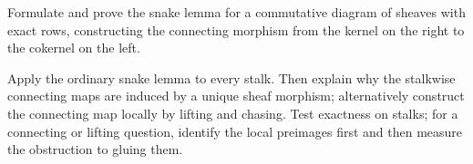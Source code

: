 \begin{problem}\label{chal:vi16-02}
Formulate and prove the snake lemma for a commutative diagram of sheaves with exact rows, constructing the connecting morphism from the kernel on the right to the cokernel on the left.
\end{problem}
\begin{hint}
Apply the ordinary snake lemma to every stalk.  Then explain why the stalkwise connecting maps are induced by a unique sheaf morphism; alternatively construct the connecting map locally by lifting and chasing. Test exactness on stalks; for a connecting or lifting question, identify the local preimages first and then measure the obstruction to gluing them.
\end{hint}
